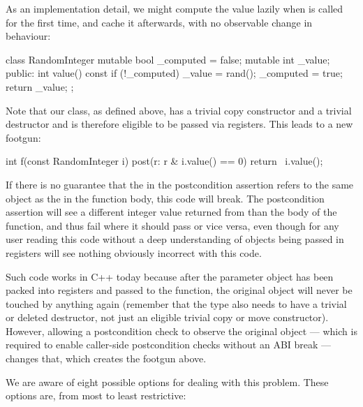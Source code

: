 As an implementation detail, we might compute the value lazily when  is called for the first time, and cache it afterwards, with no observable change in behaviour:
 \begin{codeblock}
class RandomInteger {
  mutable bool _computed = false;
  mutable int  _value;
public:
  int value() const {
    if (!_computed) {
      _value = rand();
      _computed = true;
    }
    return _value;
  }
};
 \end{codeblock}
Note that our  class, as defined above, has a trivial copy constructor and a trivial destructor and is therefore eligible to be passed via registers. This leads to a new footgun: 
 \begin{codeblock}
int f(const RandomInteger i)
post(r: r & i.value() == 0) {
  return ~i.value();
}
 \end{codeblock}
If there is no guarantee that the  in the postcondition assertion refers to the same object as the  in the function body, this code will break. The postcondition assertion will see a different integer value returned from  than the body of the function, and thus fail where it should pass or vice versa, even though for any user reading this code without a deep understanding of objects being passed in registers will see nothing obviously incorrect with this code.

Such code works in C++ today because after the parameter object has been packed into registers and passed to the function,  the original object will never be touched by anything again (remember that the type also needs to have a trivial or deleted destructor, not just an eligible trivial copy or move constructor). However, allowing a postcondition check to observe the original object --- which is required to enable caller-side postcondition checks without an ABI break --- changes that, which creates the footgun above.

We are aware of eight possible options for dealing with this problem. These options are, from most to least restrictive:

\renewcommand\labelenumi{R\arabic{enumi}.}
\renewcommand\theenumi\labelenumi

